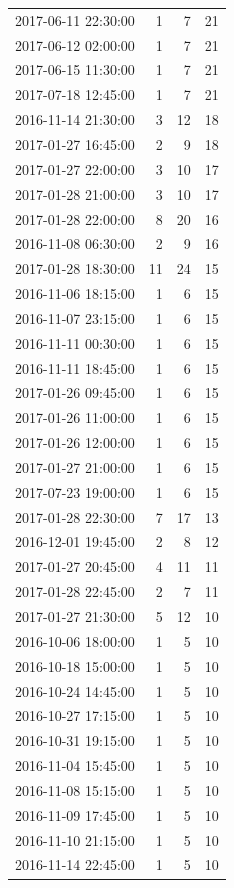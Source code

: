 \begin{tabular}{lrrr}
2017-06-11 22:30:00 & 1 & 7 & 21 \\
2017-06-12 02:00:00 & 1 & 7 & 21 \\
2017-06-15 11:30:00 & 1 & 7 & 21 \\
2017-07-18 12:45:00 & 1 & 7 & 21 \\
2016-11-14 21:30:00 & 3 & 12 & 18 \\
2017-01-27 16:45:00 & 2 & 9 & 18 \\
2017-01-27 22:00:00 & 3 & 10 & 17 \\
2017-01-28 21:00:00 & 3 & 10 & 17 \\
2017-01-28 22:00:00 & 8 & 20 & 16 \\
2016-11-08 06:30:00 & 2 & 9 & 16 \\
2017-01-28 18:30:00 & 11 & 24 & 15 \\
2016-11-06 18:15:00 & 1 & 6 & 15 \\
2016-11-07 23:15:00 & 1 & 6 & 15 \\
2016-11-11 00:30:00 & 1 & 6 & 15 \\
2016-11-11 18:45:00 & 1 & 6 & 15 \\
2017-01-26 09:45:00 & 1 & 6 & 15 \\
2017-01-26 11:00:00 & 1 & 6 & 15 \\
2017-01-26 12:00:00 & 1 & 6 & 15 \\
2017-01-27 21:00:00 & 1 & 6 & 15 \\
2017-07-23 19:00:00 & 1 & 6 & 15 \\
2017-01-28 22:30:00 & 7 & 17 & 13 \\
2016-12-01 19:45:00 & 2 & 8 & 12 \\
2017-01-27 20:45:00 & 4 & 11 & 11 \\
2017-01-28 22:45:00 & 2 & 7 & 11 \\
2017-01-27 21:30:00 & 5 & 12 & 10 \\
2016-10-06 18:00:00 & 1 & 5 & 10 \\
2016-10-18 15:00:00 & 1 & 5 & 10 \\
2016-10-24 14:45:00 & 1 & 5 & 10 \\
2016-10-27 17:15:00 & 1 & 5 & 10 \\
2016-10-31 19:15:00 & 1 & 5 & 10 \\
2016-11-04 15:45:00 & 1 & 5 & 10 \\
2016-11-08 15:15:00 & 1 & 5 & 10 \\
2016-11-09 17:45:00 & 1 & 5 & 10 \\
2016-11-10 21:15:00 & 1 & 5 & 10 \\
2016-11-14 22:45:00 & 1 & 5 & 10 \\

\end{tabular}
